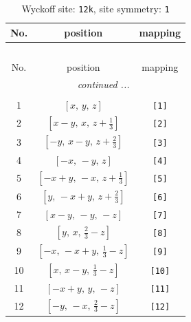\documentclass[fleqn,8pt]{jsarticle}
\begin{document}
\renewcommand{\arraystretch}{1.2}
\begin{longtable}{ccc}
\caption{Wyckoff site: {\tt 12k}, site symmetry: {\tt 1}}
 \\
 \hline \hline
No. & position & mapping \\ \hline \endfirsthead

\multicolumn{2}{l}{\tablename\ \thetable{}} \\
 \hline \hline
No. & position & mapping \\ \hline \endhead

 \hline \hline
\multicolumn{2}{r}{\footnotesize\it continued ...} \\ \endfoot

 \hline \hline
\multicolumn{2}{r}{} \\ \endlastfoot

1 & $\left[ x,\, y,\, z \right]$ & {\tt [1]} \\ \hline
2 & $\left[ x - y,\, x,\, z + \frac{1}{3} \right]$ & {\tt [2]} \\ \hline
3 & $\left[ - y,\, x - y,\, z + \frac{2}{3} \right]$ & {\tt [3]} \\ \hline
4 & $\left[ - x,\, - y,\, z \right]$ & {\tt [4]} \\ \hline
5 & $\left[ - x + y,\, - x,\, z + \frac{1}{3} \right]$ & {\tt [5]} \\ \hline
6 & $\left[ y,\, - x + y,\, z + \frac{2}{3} \right]$ & {\tt [6]} \\ \hline
7 & $\left[ x - y,\, - y,\, - z \right]$ & {\tt [7]} \\ \hline
8 & $\left[ y,\, x,\, \frac{2}{3} - z \right]$ & {\tt [8]} \\ \hline
9 & $\left[ - x,\, - x + y,\, \frac{1}{3} - z \right]$ & {\tt [9]} \\ \hline
10 & $\left[ x,\, x - y,\, \frac{1}{3} - z \right]$ & {\tt [10]} \\ \hline
11 & $\left[ - x + y,\, y,\, - z \right]$ & {\tt [11]} \\ \hline
12 & $\left[ - y,\, - x,\, \frac{2}{3} - z \right]$ & {\tt [12]} \\
\end{longtable}
\end{document}
